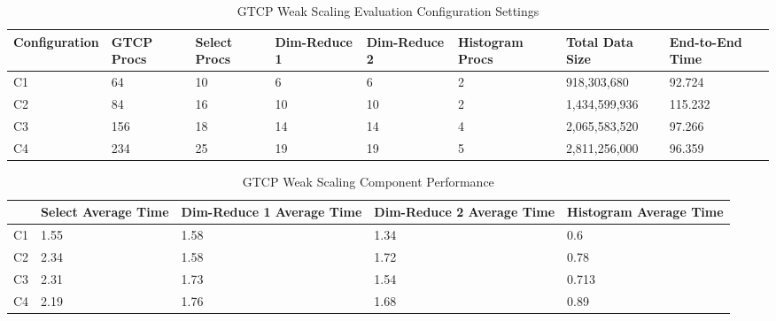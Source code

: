 \begin{table}[tbp]
\centering
\caption{GTCP Weak Scaling Evaluation Configuration Settings}
\label{tab:eval-weak-gtcp-1}
\vspace{-0.15in}
\begin{tabular}{|l|l|l|l|l|l|l|l|}
\hline
Configuration & GTCP Procs & Select Procs & Dim-Reduce 1 & Dim-Reduce 2 & Histogram Procs & Total Data Size & End-to-End Time\\
\hline
C1 & 64 & 10 & 6 & 6 & 2 & 918,303,680 & 92.724\\
\hline
C2 & 84 & 16 & 10 & 10 & 2 & 1,434,599,936 & 115.232\\
\hline
C3 & 156 & 18 & 14 & 14 & 4 & 2,065,583,520 & 97.266\\
\hline
C4 & 234 & 25 & 19 & 19 & 5 & 2,811,256,000 & 96.359\\
\hline
\end{tabular}
\vspace{-0.15in}
\end{table}

\begin{table}[tbp]
\centering
\caption{GTCP Weak Scaling Component Performance}
\label{tab:eval-weak-gtcp-2}
\vspace{-0.15in}
\begin{tabular}{|p{0.1 in}|p{0.67 in}|p{0.65 in}|p{0.65 in}|p{0.65 in}|}
\hline
 & Select Average Time & Dim-Reduce 1 Average Time & Dim-Reduce 2 Average Time & Histogram Average Time\\
\hline
C1 & 1.55 & 1.58 & 1.34 & 0.6\\
\hline
C2 & 2.34 & 1.58 & 1.72 & 0.78\\
\hline
C3 & 2.31 & 1.73 & 1.54 & 0.713\\
\hline
C4 & 2.19 & 1.76 & 1.68 & 0.89\\
\hline
\end{tabular}
\vspace{-0.25in}
\end{table}

\fi
\fi
